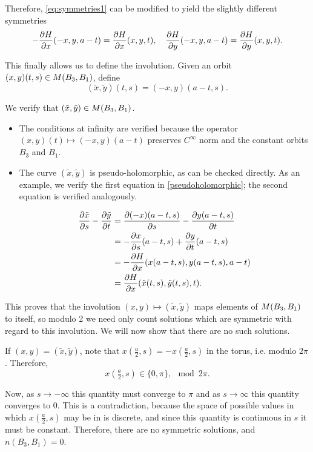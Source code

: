 Therefore, \eqref{eq:symmetries1} can be modified to yield the slightly different symmetries
\begin{equation}
- \diffp H x(-x,y,a-t) = \diffp H x(x,y,t),\quad \diffp H y(-x,y,a-t) = \diffp H y (x,y,t).
\end{equation}

This finally allows us to define the involution. Given an orbit $(x,y)(t,s) \in M(B_3,B_1)$, define
\begin{equation}
(\tilde x, \tilde y)(t,s) = (-x,y)(a-t,s).
\end{equation}

We verify that $(\tilde x, \tilde y) \in M(B_3, B_1)$.
\begin{itemize}
\item The conditions at infinity are verified because the operator $(x,y)(t) \mapsto (-x,y)(a-t)$ preserves $C^\infty$ norm and the constant orbits $B_3$ and $B_1$.

\item The curve $(\tilde x, \tilde y)$ is pseudo-holomorphic, as can be checked directly. As an example, we verify the first equation in \eqref{pseudoholomorphic}; the second equation is verified analogously.

\begin{equation}
\begin{aligned}
\diffp{\tilde x}s - \diffp{\tilde y}t &= \diffp{(-x)(a-t,s)}s - \diffp{y(a-t,s)}t\\
&= - \diffp x s(a-t, s) + \diffp y t(a-t, s)\\
&= - \diffp H x (x(a-t,s), y(a-t,s), a-t)\\
&= \diffp H x (\tilde x(t, s), \tilde y(t, s), t).
\end{aligned}
\end{equation}
\end{itemize}

This proves that the involution $(x,y) \mapsto (\tilde x, \tilde y)$ maps elements of $M(B_3,B_1)$ to itself, so modulo 2 we need only count solutions which are symmetric with regard to this involution. We will now show that there are no such solutions.

If $(x,y) = (\tilde x, \tilde y)$, note that $x(\tfrac a 2, s) = - x(\tfrac a 2, s)$ in the torus, i.e. modulo $2\pi$. Therefore,
\begin{equation}
x(\tfrac a 2, s) \in \{0,\pi\}, \mod 2\pi.
\end{equation}

Now, as $s \to -\infty$ this quantity must converge to $\pi$ and as $s \to \infty$ this quantity converges to $0$. This is a contradiction, because the space of possible values in which $x(\tfrac a 2, s)$ may be in is discrete, and since this quantity is continuous in $s$ it must be constant. Therefore, there are no symmetric solutions, and $n(B_3, B_1) = 0$.

